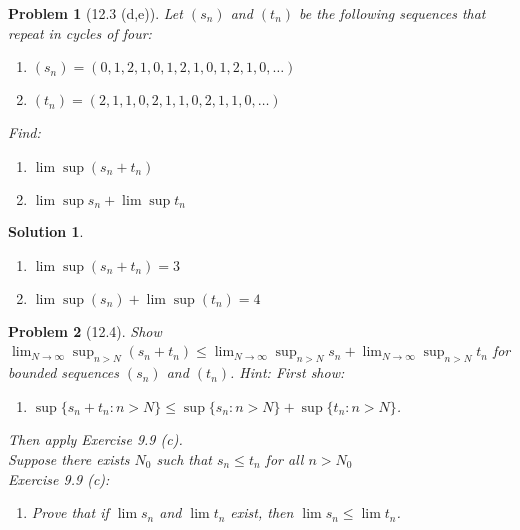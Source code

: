 \documentclass[12pt]{article}
\newtheorem{problem}{Problem}
\newtheorem{solution}{Solution}
\begin{document}
\begin{problem}[12.3 (d,e)]
Let $(s_n)$ and $(t_n)$ be the following sequences that repeat in cycles of four:
\begin{enumerate}
    \item $(s_n)=(0,1,2,1,0,1,2,1,0,1,2,1,0,\dots)$ 
        \item $(t_n)=(2,1,1,0,2,1,1,0,2,1,1,0,\dots)$  
    \end{enumerate}
Find:
\begin{enumerate}
    \item $\lim \sup (s_n+t_n)$ 
    \item $\lim \sup s_n + \lim \sup t_n$
\end{enumerate}
\end{problem}

\begin{solution}
\begin{enumerate}
    \item $\lim \sup (s_{n} + t_{n}) = 3$
    \item $\lim \sup (s_{n} )+\lim \sup (t_{n} )=4$  
\end{enumerate}    
\end{solution}

\begin{problem}[12.4]   
    Show $\lim_{N \to \infty} \sup_{n>N}(s_{n} +t_n)\leq \lim_{N \to \infty} \sup_{n>N}s_n+\lim_{N \to \infty} \sup_{n>N} t_n$ for bounded sequences $(s_n)$ and $(t_n)$. Hint: First show:
    \begin{enumerate}
        \item $\sup\{s_{n} +t_{n} : n> N\}\leq \sup\{s_{n} :n>N\}+\sup \{t_{n} :n>N\}$. 
    \end{enumerate}
    Then apply Exercise 9.9 (c).\\
    Suppose there exists $N_0$ such that $s_{n} \leq t_{n} $ for all $n>N_0$\\
    Exercise 9.9 (c):
    \begin{enumerate}
        \item Prove that if $\lim s_{n} $ and $\lim t_{n} $ exist, then $\lim s_n\leq \lim t_n$.   
    \end{enumerate}
\end{problem}
\end{document}
